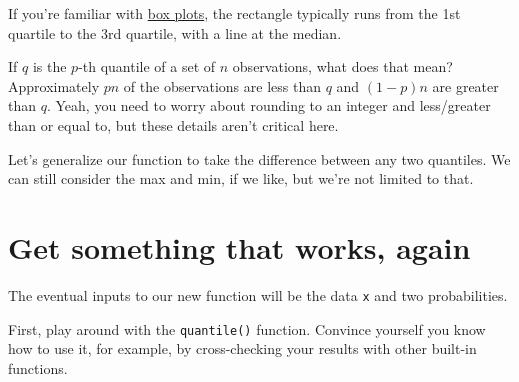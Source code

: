 \documentclass[
]{book}
\newenvironment{Shaded}{\begin{snugshade}}{\end{snugshade}}
\newcommand{\CommentTok}[1]{\textcolor[rgb]{0.56,0.35,0.01}{\textit{#1}}}
\newcommand{\DataTypeTok}[1]{\textcolor[rgb]{0.13,0.29,0.53}{#1}}
\newcommand{\FloatTok}[1]{\textcolor[rgb]{0.00,0.00,0.81}{#1}}
\newcommand{\KeywordTok}[1]{\textcolor[rgb]{0.13,0.29,0.53}{\textbf{#1}}}
\newcommand{\NormalTok}[1]{#1}
\newcommand{\OperatorTok}[1]{\textcolor[rgb]{0.81,0.36,0.00}{\textbf{#1}}}
\newcommand{\OtherTok}[1]{\textcolor[rgb]{0.56,0.35,0.01}{#1}}
\begin{document}
If you're familiar with \href{https://en.wikipedia.org/wiki/Box_plot}{box plots}, the rectangle typically runs from the 1st quartile to the 3rd quartile, with a line at the median.

If \(q\) is the \(p\)-th quantile of a set of \(n\) observations, what does that mean? Approximately \(pn\) of the observations are less than \(q\) and \((1 - p)n\) are greater than \(q\). Yeah, you need to worry about rounding to an integer and less/greater than or equal to, but these details aren't critical here.

Let's generalize our function to take the difference between any two quantiles. We can still consider the max and min, if we like, but we're not limited to that.

\hypertarget{get-something-that-works-again}{%
\section{Get something that works, again}\label{get-something-that-works-again}}

The eventual inputs to our new function will be the data \texttt{x} and two probabilities.

First, play around with the \texttt{quantile()} function. Convince yourself you know how to use it, for example, by cross-checking your results with other built-in functions.

\begin{Shaded}
\end{Shaded}
\end{document}

